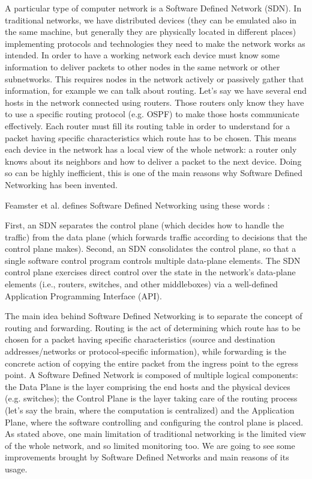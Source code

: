 \documentclass[a4paper,10pt]{memoir}
\begin{document}
A particular type of computer network is a Software Defined Network (SDN). In traditional networks, we have distributed devices (they can be emulated also in the same machine, but generally they are physically located in different places) implementing protocols and technologies they need to make the network works as intended. In order to have a working network each device must know some information to deliver packets to other nodes in the same network or other subnetworks. This requires nodes in the network actively or passively gather that information, for example we can talk about routing. Let's say we have several end hosts in the network connected using routers. Those routers only know they have to use a specific routing protocol (e.g. OSPF) to make those hosts communicate effectively. Each router must fill its routing table in order to understand for a packet having specific characteristics which route has to be chosen. This means each device in the network has a local view of the whole network: a router only knows about its neighbors and how to deliver a packet to the next device. Doing so can be highly inefficient, this is one of the main reasons why Software Defined Networking has been invented.
 
Feamster et al. defines Software Defined Networking using these words \cite{sdn-definition}:
\begin{quoting}[font=itshape, begintext={"}, endtext={"}]
First, an SDN separates the control plane (which decides how to handle the traffic) from the data plane (which forwards traffic according to decisions that the control plane makes). Second, an SDN consolidates the control plane, so that a single software control program controls multiple data-plane elements. The SDN control plane exercises direct control over the state in the network’s data-plane elements (i.e., routers, switches, and other middleboxes) via a well-defined Application Programming Interface (API).
\end{quoting}

The main idea behind Software Defined Networking is to separate the concept of routing and forwarding. Routing is the act of determining which route has to be chosen for a packet having specific characteristics (source and destination addresses/networks or protocol-specific information), while forwarding is the concrete action of copying the entire packet from the ingress point to the egress point. A Software Defined Network is composed of multiple logical components: the Data Plane is the layer comprising the end hosts and the physical devices (e.g. switches); the Control Plane is the layer taking care of the routing process (let's say the brain, where the computation is centralized) and the Application Plane, where the software controlling and configuring the control plane is placed. As stated above, one main limitation of traditional networking is the limited view of the whole network, and so limited monitoring too. We are going to see some improvements brought by Software Defined Networks and main reasons of its usage.
\end{document}
